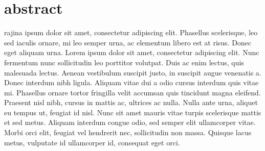 \chapter*{abstract}
\label{chap:abstract}

rajina ipsum dolor sit amet, consectetur adipiscing elit. Phasellus scelerisque, leo sed iaculis ornare, mi leo semper urna, ac elementum libero est at risus. Donec eget aliquam urna. Lorem ipsum dolor sit amet, consectetur adipiscing elit. Nunc fermentum nunc sollicitudin leo porttitor volutpat. Duis ac enim lectus, quis malesuada lectus. Aenean vestibulum suscipit justo, in suscipit augue venenatis a. Donec interdum nibh ligula. Aliquam vitae dui a odio cursus interdum quis vitae mi. Phasellus ornare tortor fringilla velit accumsan quis tincidunt magna eleifend. Praesent nisl nibh, cursus in mattis ac, ultrices ac nulla. Nulla ante urna, aliquet eu tempus ut, feugiat id nisl. Nunc sit amet mauris vitae turpis scelerisque mattis et sed metus. Aliquam interdum congue odio, sed semper elit ullamcorper vitae. Morbi orci elit, feugiat vel hendrerit nec, sollicitudin non massa. Quisque lacus metus, vulputate id ullamcorper id, consequat eget orci. 
